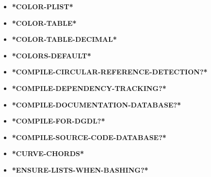 \documentclass [11pt]{book}
\begin{document}
\begin{itemize}

\item {}
\textbf{*COLOR-PLIST*}





\item {}
\textbf{*COLOR-TABLE*}





\item {}
\textbf{*COLOR-TABLE-DECIMAL*}





\item {}
\textbf{*COLORS-DEFAULT*}





\item {}
\textbf{*COMPILE-CIRCULAR-REFERENCE-DETECTION?*}





\item {}
\textbf{*COMPILE-DEPENDENCY-TRACKING?*}





\item {}
\textbf{*COMPILE-DOCUMENTATION-DATABASE?*}





\item {}
\textbf{*COMPILE-FOR-DGDL?*}





\item {}
\textbf{*COMPILE-SOURCE-CODE-DATABASE?*}





\item {}
\textbf{*CURVE-CHORDS*}





\item {}
\textbf{*ENSURE-LISTS-WHEN-BASHING?*}






\end{itemize}
\end{document}
